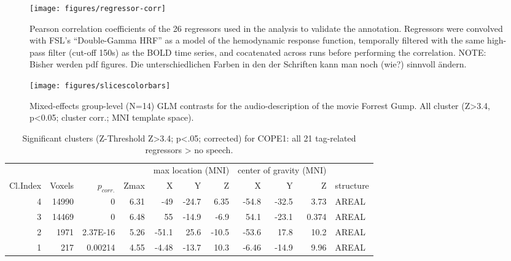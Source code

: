 \documentclass[10pt,a4paper,twocolumn]{article}
\begin{document}
\begin{figure*}
  \centering
  \texttt{[image: figures/regressor-corr]}
  \caption{Pearson correlation coefficients of the 26 regressors used in the analysis to validate the annotation. Regressors were convolved with FSL's “Double-Gamma HRF” as a model of the hemodynamic response function, temporally filtered with the same high-pass filter (cut-off 150s) as the BOLD time series, and cocatenated across runs before performing the correlation. NOTE: Bisher werden pdf figures. Die unterschiedlichen Farben in den der Schriften kann man noch (wie?) sinnvoll ändern.}
  \label{fig:correlation}
\end{figure*}


\begin{figure*}
  \centering
  \texttt{[image: figures/slicescolorbars]}
  \caption{Mixed-effects group-level (N=14) GLM contrasts for the audio-description of the movie Forrest Gump. All cluster (Z>3.4, p<0.05; cluster corr.; MNI template space).}
  \label{fig:results}
\end{figure*}


\begin{table*}[t]
    \caption{Significant clusters (Z-Threshold Z>3.4; p<.05; corrected) for COPE1: all 21 tag-related regressors > no speech.}
\begin{tabular}{rrrrrrrrrrp{3cm}}
\toprule
& & & & \multicolumn{3}{r}{max location (MNI)} & \multicolumn{3}{r}{center of gravity (MNI)} &
\\ \cmidrule{5-7} \cmidrule{8-10}
Cl.\-Index & Voxels & $p_{corr.}$ & Z\-max & X & Y & Z  & X & Y & Z & structure \\
\midrule
4 & 14990 & 0 & 6.31 & -49 & -24.7 & 6.35 & -54.8 & -32.5 & 3.73 & AREAL \\
3 & 14469 & 0 & 6.48 & 55 & -14.9 & -6.9 & 54.1 & -23.1 & 0.374 & AREAL \\
2 & 1971 & 2.37E-16 & 5.26 & -51.1 & 25.6 & -10.5 & -53.6 & 17.8 & 10.2 & AREAL \\
1 & 217 & 0.00214 & 4.55 & -4.48 & -13.7 & 10.3 & -6.46 & -14.9 & 9.96 & AREAL \\
\bottomrule
\end{tabular}
\label{tab:cope1}
\end{table*}
\end{document}
